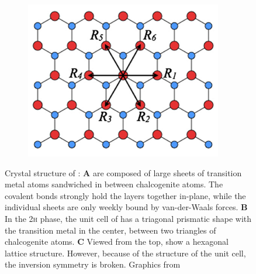 \begin{figure}[t]
\begin{subfigure}{0.30\textwidth}
		\label{crystal2}
	\end{subfigure}
	\begin{subfigure}{0.30\textwidth}
		\centering
		\caption{}
		\includegraphics[height=.9\textwidth,right]{topview}
		\label{crystal3}
	\end{subfigure}
	\caption{Crystal structure of \tmds\!: \textbf{A} \tmds are composed of large sheets of transition metal atoms sandwiched in between chalcogenite atoms. The covalent bonds strongly hold the layers together in-plane, while the individual sheets are only weekly bound by van-der-Waals forces. \textbf{B} In the 2\textsc{h} phase, the unit cell of \tmds has a triagonal prismatic shape with the transition metal in the center, between two triangles of chalcogenite atoms. \textbf{C} Viewed from the top, \tmds show a hexagonal lattice structure. However, because of the structure of the unit cell, the inversion symmetry is broken. Graphics from\cite{wang_electronics_2012, xiao_coupled_2012}}\label{crystal}
\end{figure}

